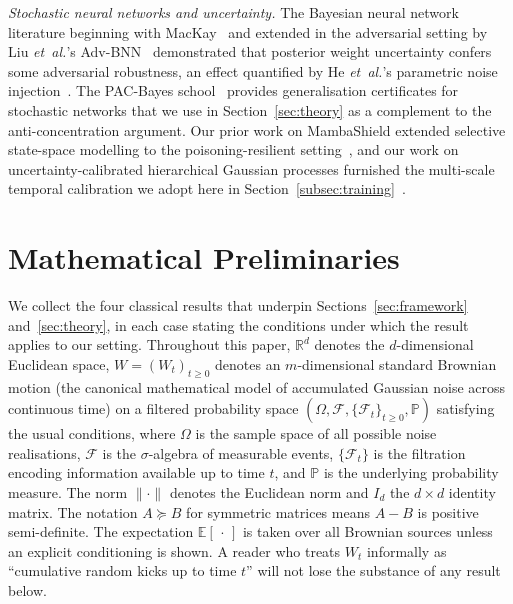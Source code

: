 \documentclass[journal,10pt]{IEEEtran}
\theoremstyle{definition}
\theoremstyle{remark}
\newcommand{\Real}{\mathbb{R}}
\newcommand{\Exp}{\mathbb{E}}
\newcommand{\Prob}{\mathbb{P}}
\newcommand{\Fcal}{\mathcal{F}}
\begin{document}
\emph{Stochastic neural networks and uncertainty.} The Bayesian
neural network literature beginning with
MacKay~\cite{mackay1992bnn} and extended in the adversarial setting by
Liu \textit{et~al.}'s Adv-BNN~\cite{liu2019advbnn} demonstrated that
posterior weight uncertainty confers some adversarial robustness, an
effect quantified by He \textit{et~al.}'s parametric noise
injection~\cite{he2019pni}. The PAC-Bayes
school~\cite{mcallester1999pacbayes,dziugaite2017pacbayes,perezortiz2021pacbayes}
provides generalisation certificates for stochastic networks that
we use in Section~\ref{sec:theory} as a complement to the
anti-concentration argument. Our prior work on MambaShield extended
selective state-space modelling to the poisoning-resilient
setting~\cite{anaedevha2026mambashield}, and our work on
uncertainty-calibrated hierarchical Gaussian processes furnished the
multi-scale temporal calibration we adopt here in
Section~\ref{subsec:training}~\cite{anaedevha2026uchgp}.

\section{Mathematical Preliminaries}\label{sec:prelim}
We collect the four classical results that underpin
Sections~\ref{sec:framework} and~\ref{sec:theory}, in each case
stating the conditions under which the result applies to our setting.
Throughout this paper, $\Real^d$ denotes the $d$-dimensional Euclidean
space, $W=(W_t)_{t\geq 0}$ denotes an $m$-dimensional standard Brownian
motion (the canonical mathematical model of accumulated Gaussian noise
across continuous time) on a filtered probability space
$(\Omega,\Fcal,\{\Fcal_t\}_{t\geq 0},\Prob)$ satisfying the usual
conditions, where $\Omega$ is the sample space of all possible noise
realisations, $\Fcal$ is the $\sigma$-algebra of measurable events,
$\{\Fcal_t\}$ is the filtration encoding information available up to
time $t$, and $\Prob$ is the underlying probability measure. The norm
$\|\cdot\|$ denotes the Euclidean norm and $I_d$ the
$d\times d$ identity matrix. The notation $A\succeq B$ for symmetric
matrices means $A-B$ is positive semi-definite. The expectation
$\Exp[\,\cdot\,]$ is taken over all Brownian sources unless an
explicit conditioning is shown. A reader who treats $W_t$ informally
as ``cumulative random kicks up to time $t$'' will not lose the
substance of any result below.
\end{document}
